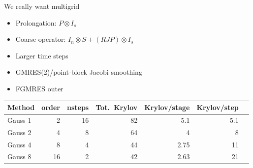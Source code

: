 \documentclass{beamer}
\begin{document}
\begin{frame}{We really want multigrid}
  \begin{itemize}
  \item Prolongation: $P \otimes I_s$
  \item Coarse operator: $I_n \otimes S + (R J P) \otimes I_s$
  \item Larger time steps
  \item GMRES(2)/point-block Jacobi smoothing
  \item FGMRES outer
  \end{itemize}
  \begin{tabular}{lrrrrrr}
    \toprule
    Method & order & nsteps & Tot.~Krylov & Krylov/stage & Krylov/step \\
    \midrule
    Gauss 1 & 2 & 16 & 82 & 5.1 & 5.1 \\
    Gauss 2 & 4 & 8 & 64 & 4 & 8\\
    Gauss 4 & 8 & 4 & 44 & 2.75 & 11 \\
    Gauss 8 & 16 & 2 & 42 & 2.63 & 21 \\
    \bottomrule
  \end{tabular}
\end{frame}
\end{document}
